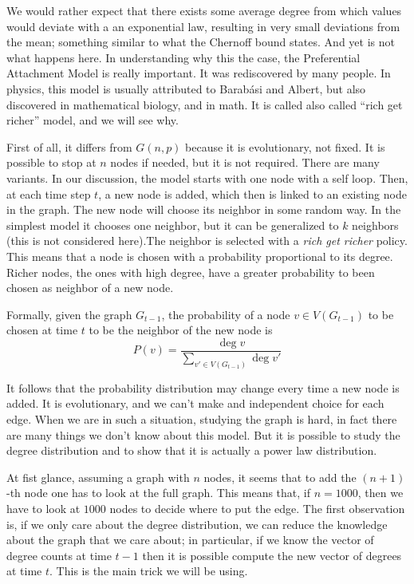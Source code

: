 We would rather expect that there exists some average degree from which values would deviate with a an exponential law, resulting in very small deviations from the mean; something similar to what the Chernoff bound states. And yet is not what happens here. In understanding why this the case, the Preferential Attachment Model is really important. It was rediscovered by many people. In physics, this model is usually attributed to Barabási and Albert, but also discovered in mathematical biology, and in math. It is called also called ``rich get richer'' model, and we will see why.

First of all, it differs from $G(n,p)$ because it is evolutionary, not fixed. It is possible to stop at $n$ nodes if needed, but it is not required. There are many variants. In our discussion, the model starts with one node with a self loop. Then, at each time step $t$, a new node is added, which then is linked to an existing node in the graph. The new node will choose its neighbor in some random way. In the simplest model it chooses one neighbor, but it can be generalized to $k$ neighbors (this is not considered here).The neighbor is selected with a \emph{rich get richer} policy. This means that a node is chosen with a probability proportional to its degree. Richer nodes, the ones with high degree, have a greater probability to been chosen as neighbor of a new node.

Formally, given the graph $G_{t-1}$, the probability of a node $v \in V(G_{t-1})$ to be chosen at time $t$ to be the neighbor of the new node is
\begin{equation}
P(v) = \frac{\deg{v}}{\sum_{v' \in V(G_{t-1})} \deg{v'}}
\end{equation}

It follows that the probability distribution may change every time a new node is added. It is evolutionary, and we can't make and independent choice for each edge. When we are in such a situation, studying the graph is hard, in fact there are many things we don't know about this model. But it is possible to study the degree distribution and to show  that it is actually a power law distribution.

At fist glance, assuming a graph with $n$ nodes, it seems that to add the $(n+1)$-th node one has to look at the full graph. This means that, if $n = 1000$, then we have to look at $1000$ nodes to decide where to put the edge. The first observation is, if we only care about the degree distribution, we can reduce the knowledge about the graph that we care about; in particular, if we know the vector of degree counts at time $t-1$ then it is possible compute the new vector of degrees at time $t$. This is the main trick we will be using.

